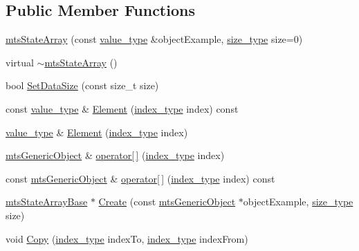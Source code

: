 \subsection*{Public Member Functions}
\begin{DoxyCompactItemize}
\item 
\hyperlink{classmts_state_array_a3100d37141bac1c739cf79fb761b28e8}{mts\+State\+Array} (const \hyperlink{classmts_state_array_a1d78f1e353af8687797d4a359b694ee1}{value\+\_\+type} \&object\+Example, \hyperlink{classmts_state_array_base_a2a29f8b24a48620f67c907fc5592fc17}{size\+\_\+type} size=0)
\item 
virtual \hyperlink{classmts_state_array_a31aea7797304325d5724ac9c52613a3b}{$\sim$mts\+State\+Array} ()
\item 
bool \hyperlink{classmts_state_array_a3864cab02bda42e0e04712423c72ac16}{Set\+Data\+Size} (const size\+\_\+t size)
\item 
const \hyperlink{classmts_state_array_a1d78f1e353af8687797d4a359b694ee1}{value\+\_\+type} \& \hyperlink{classmts_state_array_a8bf09ef47789fa1a66fc22ccb4339164}{Element} (\hyperlink{classmts_state_array_base_a22ecbf65a907a7550951d12970f3df1d}{index\+\_\+type} index) const 
\item 
\hyperlink{classmts_state_array_a1d78f1e353af8687797d4a359b694ee1}{value\+\_\+type} \& \hyperlink{classmts_state_array_a7e6691934e346dc11c24cb9e07e0820c}{Element} (\hyperlink{classmts_state_array_base_a22ecbf65a907a7550951d12970f3df1d}{index\+\_\+type} index)
\item 
\hyperlink{classmts_generic_object}{mts\+Generic\+Object} \& \hyperlink{classmts_state_array_a3ce4d9065a8807833d7ff85c00c66449}{operator\mbox{[}$\,$\mbox{]}} (\hyperlink{classmts_state_array_base_a22ecbf65a907a7550951d12970f3df1d}{index\+\_\+type} index)
\item 
const \hyperlink{classmts_generic_object}{mts\+Generic\+Object} \& \hyperlink{classmts_state_array_a0c002191085699eaaa3fab8d1f8b753e}{operator\mbox{[}$\,$\mbox{]}} (\hyperlink{classmts_state_array_base_a22ecbf65a907a7550951d12970f3df1d}{index\+\_\+type} index) const 
\item 
\hyperlink{classmts_state_array_base}{mts\+State\+Array\+Base} $\ast$ \hyperlink{classmts_state_array_ac82b7151bf8a7e733a043555d3312378}{Create} (const \hyperlink{classmts_generic_object}{mts\+Generic\+Object} $\ast$object\+Example, \hyperlink{classmts_state_array_base_a2a29f8b24a48620f67c907fc5592fc17}{size\+\_\+type} size)
\item 
void \hyperlink{classmts_state_array_afca557827cf934c90381a27704f0f064}{Copy} (\hyperlink{classmts_state_array_base_a22ecbf65a907a7550951d12970f3df1d}{index\+\_\+type} index\+To, \hyperlink{classmts_state_array_base_a22ecbf65a907a7550951d12970f3df1d}{index\+\_\+type} index\+From)
\end{DoxyCompactItemize}
